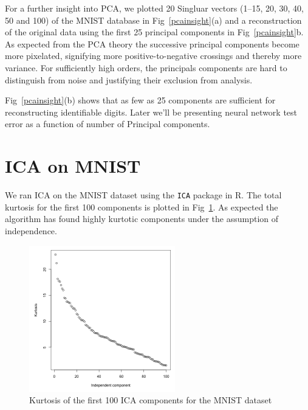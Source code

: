 \documentclass[10pt,letterpaper]{article}
\begin{document}
%
For a further insight into PCA, we plotted 20 Singluar vectors (1--15, 20, 30, 40, 50 and 100) of the MNIST database in Fig~\ref{pcainsight}(a) and a reconstruction of the original data using the first 25 principal components in Fig~\ref{pcainsight}{b}. As expected from the PCA theory the successive principal components become more pixelated, signifying more positive-to-negative crossings and thereby more variance. For sufficiently high orders, the principals components are hard to distinguish from noise and justifying their exclusion from analysis. 

Fig~\ref{pcainsight}(b) shows that as few as 25 components are sufficient for reconstructing identifiable digits. Later we'll be presenting neural network test error as a function of number of Principal components.
\section{ICA on MNIST}
We ran ICA on the MNIST dataset using the {\tt ICA} package in R. The total kurtosis for the first 100 components is plotted in Fig~\ref{icadist}. As expected the algorithm has found highly kurtotic components under the assumption of independence. 
%
\begin{figure}[bp]
    \begin{center}
    \includegraphics[width=2.5in]{../plots/icadist.png}
    \caption{Kurtosis of the first 100 ICA components for the MNIST dataset \label{icadist}}
    \end{center}
\end{figure}
%
\end{document}
